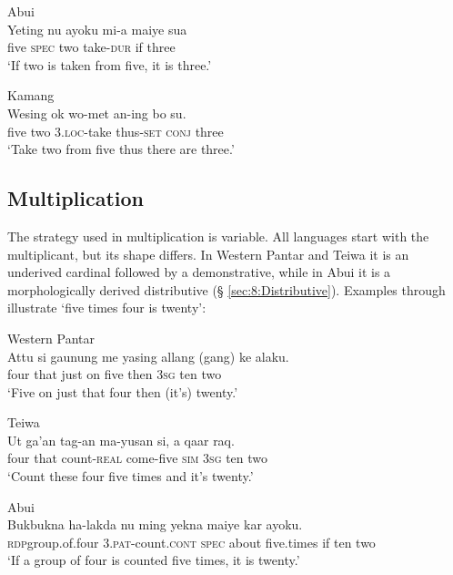 \ea
\label{ex:8:1243}
{\upshape Abui}\\
 \gll Yeting  nu  ayoku  mi-a  maiye  sua\\
  five  \textsc{spec } two  take-\textsc{dur } if  three   \\
 \glt `If two is taken from five, it is three.' 
\z
 
  

\ea%
\label{bkm:Ref358115306}
  
{\upshape Kamang}\\
\gll  Wesing  ok  wo-met  an-ing  bo  su.   \\  
    five  two   3.\textsc{loc-}take  thus\textsc{{}-set}  \textsc{conj} three   \\
\glt `Take two from five thus there are three.' 
\z



 

 

\subsection{Multiplication}
\label{sec:8:Multiplication}
The strategy used in multiplication is variable. All languages start with the multiplicant, but its shape differs. In Western Pantar and Teiwa it is an underived cardinal followed by a demonstrative, while in Abui it is a morphologically derived distributive ({\S} \ref{sec:8:Distributive}). Examples  through   illustrate `five times four is twenty':


\ea%
\label{bkm:Ref358043144}
{\upshape Western Pantar}\\
\gll Attu  si  gaunung  me  yasing   allang  (gang)  ke alaku. \\  
   four  that  just  on  five  then  3\textsc{sg } ten two   \\
\glt `Five on just that four then (it's) twenty.'
\z


\ea
\label{ex:8:1244}
{\upshape Teiwa}\\ 
 \gll   Ut  ga'an  tag-an  ma-yusan  si,  a   qaar raq.  \\
    four  that   count-\textsc{real } come-five  \textsc{sim}  \textsc{3sg} ten two  \\
 \glt `Count these four five times and it's twenty.'
\z



\ea
\label{ex:8:1245}
{\upshape Abui}\\ 
 \gll Buk{\Tilde}bukna  ha-lakda  nu  ming  yekna  maiye  kar ayoku. \\
  \textsc{rdp}{\Tilde}group.of.four  \textsc{3.pat}-count.\textsc{cont}  \textsc{spec}  about  five.times  if  ten two  \\
 \glt  `If a group of four is counted five times, it is twenty.'
\z

